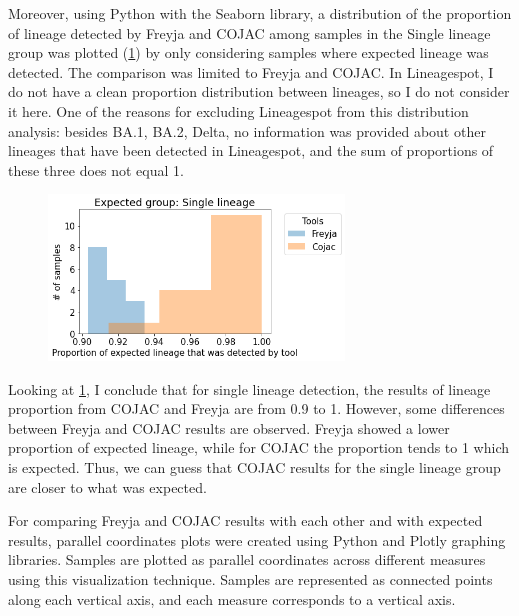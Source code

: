                 Moreover, using Python with the Seaborn library, a distribution of the proportion of lineage detected by Freyja and COJAC among samples in the Single lineage group was plotted (\cref{fig:results:mock:dist-singlin}) by only considering samples where expected lineage was detected. The comparison was limited to Freyja and COJAC. In Lineagespot, I do not have a clean proportion distribution between lineages, so I do not consider it here. One of the reasons for excluding Lineagespot from this distribution analysis: besides BA.1, BA.2, Delta, no information was provided about other lineages that have been detected in Lineagespot, and the sum of proportions of these three does not equal 1. 
                \begin{figure}[ht!]
                	\centering
                    \includegraphics[width=0.7\textwidth]{figures/results/mock/dist-singlin-fr-co.png}
                    \label{fig:results:mock:dist-singlin}
                \end{figure}
                Looking at \cref{fig:results:mock:dist-singlin}, I conclude that for single lineage detection, the results of lineage proportion from COJAC and Freyja are from 0.9 to 1. However, some differences between Freyja and COJAC results are observed. Freyja showed a lower proportion of expected lineage, while for COJAC the proportion tends to 1 which is expected. Thus, we can guess that COJAC results for the single lineage group are closer to what was expected.
                
                For comparing Freyja and COJAC results with each other and with expected results, parallel coordinates plots were created using Python and Plotly graphing libraries. Samples are plotted as parallel coordinates across different measures using this visualization technique. Samples are represented as connected points along each vertical axis, and each measure corresponds to a vertical axis. 

